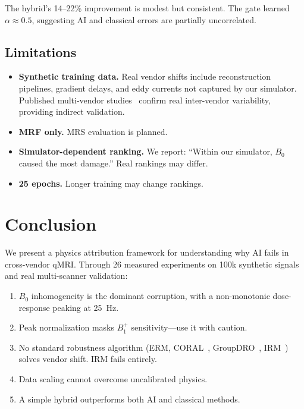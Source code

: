 \documentclass[11pt,a4paper]{article}
\begin{document}
The hybrid's 14--22\% improvement is modest but consistent. The gate
learned $\alpha \approx 0.5$, suggesting AI and classical errors are
partially uncorrelated.

\subsection{Limitations}
\begin{itemize}
  \item \textbf{Synthetic training data.} Real vendor shifts include
    reconstruction pipelines, gradient delays, and eddy currents not
    captured by our simulator. Published multi-vendor
    studies~\cite{captur2020t1} confirm real inter-vendor variability,
    providing indirect validation.
  \item \textbf{MRF only.} MRS evaluation is planned.
  \item \textbf{Simulator-dependent ranking.} We report: ``Within our
    simulator, $B_0$ caused the most damage.'' Real rankings may differ.
  \item \textbf{25 epochs.} Longer training may change rankings.
\end{itemize}


\section{Conclusion}
\label{sec:conclusion}

We present a physics attribution framework for understanding why AI
fails in cross-vendor qMRI. Through 26 measured experiments on 100k
synthetic signals and real multi-scanner validation:

\begin{enumerate}
  \item $B_0$ inhomogeneity is the dominant corruption, with a
    non-monotonic dose-response peaking at 25~Hz.
  \item Peak normalization masks $B_1^+$ sensitivity---use it with
    caution.
  \item No standard robustness algorithm (ERM, CORAL~\cite{sun2016deep},
    GroupDRO~\cite{sagawa2020distributionally}, IRM~\cite{arjovsky2019invariant})
    solves vendor shift. IRM fails entirely.
  \item Data scaling cannot overcome uncalibrated physics.
  \item A simple hybrid outperforms both AI and classical methods.
\end{enumerate}
\end{document}
